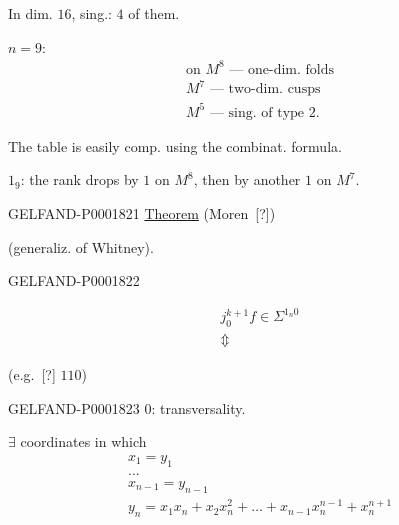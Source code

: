 In dim. $16$, sing.: $4$ of them.

\underline{$n=9$}:
\begin{gather*}
\text{on }M^8\text{ — one-dim. folds}\\
M^7\text{ — two-dim. cusps}\\
M^5\text{ — sing. of type }2.
\end{gather*}

The table is easily comp. using the combinat. formula.

$1_9$: the rank drops by $1$ on $M^8$, then by another $1$ on $M^7$.




\begin{GelfandAdjacentEvidence}{GELFAND-P000182}{1}
\underline{Theorem} (Moren\, [?])

(generaliz. of Whitney).
\end{GelfandAdjacentEvidence}
\begin{GelfandAdjacentEvidence}{GELFAND-P000182}{2}

\begin{gather*}j_0^{k+1}f\in\Sigma^{1_n0}\\\Updownarrow\end{gather*}
\end{GelfandAdjacentEvidence}

(e.g.\, [?] $110$)

\begin{GelfandAdjacentEvidence}{GELFAND-P000182}{3}
$0$: transversality.
\end{GelfandAdjacentEvidence}

$\exists$ coordinates in which
\begin{gather*}
x_1=y_1\\
\ldots\\
x_{n-1}=y_{n-1}\\
y_n=x_1x_n+x_2x_n^2+\ldots+x_{n-1}x_n^{n-1}+x_n^{n+1}
\end{gather*}

